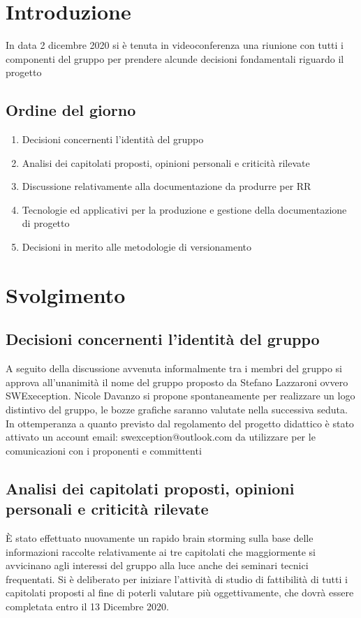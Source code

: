 \section{Introduzione}
In data 2 dicembre 2020 si è tenuta in videoconferenza una riunione con tutti i componenti del gruppo per prendere alcunde decisioni fondamentali riguardo il progetto

\subsection{Ordine del giorno}
\begin{enumerate}
    \item Decisioni concernenti l'identità del gruppo
    \item Analisi dei capitolati proposti, opinioni personali e criticità rilevate
    \item Discussione relativamente alla documentazione da produrre per RR
    \item Tecnologie ed applicativi per la produzione e gestione della documentazione di progetto
    \item Decisioni in merito alle metodologie di versionamento
\end{enumerate}

\section{Svolgimento}

\subsection{Decisioni concernenti l'identità del gruppo}
A seguito della discussione avvenuta informalmente tra i membri del gruppo si approva all’unanimità il nome del gruppo proposto da Stefano Lazzaroni ovvero SWExeception. Nicole Davanzo si propone spontaneamente per realizzare un logo distintivo del gruppo, le bozze grafiche saranno valutate nella successiva seduta.
In ottemperanza a quanto previsto dal regolamento del progetto didattico è stato attivato un account email: swexception@outlook.com da utilizzare per le comunicazioni con i proponenti e committenti

\subsection{Analisi dei capitolati proposti, opinioni personali e criticità rilevate}
È stato effettuato nuovamente un rapido brain storming sulla base delle informazioni raccolte relativamente ai tre capitolati che maggiormente si avvicinano agli interessi del gruppo alla luce anche dei seminari tecnici frequentati.
Si è deliberato per iniziare l’attività di studio di fattibilità di tutti i capitolati proposti al fine di poterli valutare più oggettivamente, che dovrà essere completata entro il 13 Dicembre 2020.

